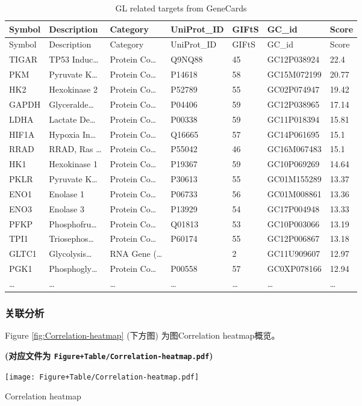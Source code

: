 \documentclass[
]{article}
\begin{document}
\begin{longtable}[]{@{}lllllll@{}}
\caption{\label{tab:GL-related-targets-from-GeneCards}GL related targets from GeneCards}\tabularnewline
\toprule
Symbol & Description & Category & UniProt\_ID & GIFtS & GC\_id & Score\tabularnewline
\midrule
\endfirsthead
\toprule
Symbol & Description & Category & UniProt\_ID & GIFtS & GC\_id & Score\tabularnewline
\midrule
\endhead
TIGAR & TP53 Induc\ldots{} & Protein Co\ldots{} & Q9NQ88 & 45 & GC12P038924 & 22.4\tabularnewline
PKM & Pyruvate K\ldots{} & Protein Co\ldots{} & P14618 & 58 & GC15M072199 & 20.77\tabularnewline
HK2 & Hexokinase 2 & Protein Co\ldots{} & P52789 & 55 & GC02P074947 & 19.42\tabularnewline
GAPDH & Glyceralde\ldots{} & Protein Co\ldots{} & P04406 & 59 & GC12P038965 & 17.14\tabularnewline
LDHA & Lactate De\ldots{} & Protein Co\ldots{} & P00338 & 59 & GC11P018394 & 15.81\tabularnewline
HIF1A & Hypoxia In\ldots{} & Protein Co\ldots{} & Q16665 & 57 & GC14P061695 & 15.1\tabularnewline
RRAD & RRAD, Ras \ldots{} & Protein Co\ldots{} & P55042 & 46 & GC16M067483 & 15.1\tabularnewline
HK1 & Hexokinase 1 & Protein Co\ldots{} & P19367 & 59 & GC10P069269 & 14.64\tabularnewline
PKLR & Pyruvate K\ldots{} & Protein Co\ldots{} & P30613 & 55 & GC01M155289 & 13.37\tabularnewline
ENO1 & Enolase 1 & Protein Co\ldots{} & P06733 & 56 & GC01M008861 & 13.36\tabularnewline
ENO3 & Enolase 3 & Protein Co\ldots{} & P13929 & 54 & GC17P004948 & 13.33\tabularnewline
PFKP & Phosphofru\ldots{} & Protein Co\ldots{} & Q01813 & 53 & GC10P003066 & 13.19\tabularnewline
TPI1 & Triosephos\ldots{} & Protein Co\ldots{} & P60174 & 55 & GC12P006867 & 13.18\tabularnewline
GLTC1 & Glycolysis\ldots{} & RNA Gene (\ldots{} & & 2 & GC11U909607 & 12.97\tabularnewline
PGK1 & Phosphogly\ldots{} & Protein Co\ldots{} & P00558 & 57 & GC0XP078166 & 12.94\tabularnewline
\ldots{} & \ldots{} & \ldots{} & \ldots{} & \ldots{} & \ldots{} & \ldots{}\tabularnewline
\bottomrule
\end{longtable}

\hypertarget{ux5173ux8054ux5206ux6790}{%
\subsubsection{关联分析}\label{ux5173ux8054ux5206ux6790}}

Figure \ref{fig:Correlation-heatmap} (下方图) 为图Correlation heatmap概览。

\textbf{(对应文件为 \texttt{Figure+Table/Correlation-heatmap.pdf})}

\def\@captype{figure}
\begin{center}
\texttt{[image: Figure+Table/Correlation-heatmap.pdf]}
\caption{Correlation heatmap}\label{fig:Correlation-heatmap}
\end{center}
\end{document}
